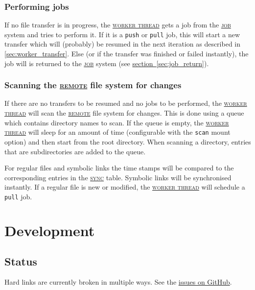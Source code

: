 \documentclass[a4paper]{article}
\newcommand{\component}[1]{\hyperref[comp:#1]{\textsc{#1}}\xspace}
\newcommand{\job}{\component{job}}
\newcommand{\jobtype}[1]{\texttt{#1}\xspace}
\newcommand{\push}{\jobtype{push}}
\newcommand{\pull}{\jobtype{pull}}
\newcommand{\sync}{\component{sync}}
\newcommand{\remote}{\component{remote}}
\newcommand{\workerthread}{\hyperref[comp:workerthread]{\textsc{worker thread}}\xspace}
\newcommand{\sectionref}[1]{\hyperref[#1]{section~\ref{#1}}}
\begin{document}
\subsubsection{Performing jobs} %
\label{sec:worker_perform_job}
If no file transfer is in progress, the \workerthread gets a job from the \job
system and tries to perform it. If it is a \push or \pull job, this will start a
new transfer which will (probably) be resumed in the next iteration as described
in \ref{sec:worker_transfer}. Else (or if the transfer was finished or failed
instantly), the job will is returned to the \job system (see
\sectionref{sec:job_return}).

\subsubsection{Scanning the \remote file system for changes} %
\label{sec:worker_scan_remote}
If there are no transfers to be resumed and no jobs to be performed, the
\workerthread will scan the \remote file system for changes. This is done using
a queue which contains directory names to scan. If the queue is empty, the
\workerthread will sleep for an amount of time (configurable with the
\texttt{scan} mount option) and then start from the root directory. When
scanning a directory, entries that are subdirectories are added to the queue.

For regular files and symbolic links the time stamps will be compared to the
corresponding entries in the \sync table. Symbolic links will be synchronised
instantly. If a regular file is new or modified, the \workerthread will
schedule a \pull job.



\section{Development} %

\subsection{Status}
Hard links are currently broken in multiple ways. See the
\href{https://github.com/rmartinjak/discofs/issues}{issues on GitHub}.


\pagebreak
\clearpage
{}
\end{document}
